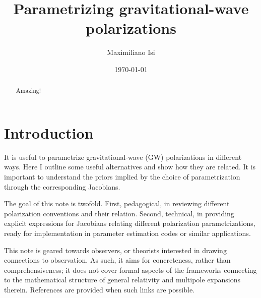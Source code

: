 \documentclass[aps,prd,twocolumn,superscriptaddress,preprintnumbers,floatfix,nofootinbib]{revtex4-2}
\newcommand{\dcc}{LIGO-PXXXXXXX}
\begin{document}

\title{Parametrizing gravitational-wave polarizations}

\author{Maximiliano Isi}


\date{\today}

\begin{abstract}
Amazing!
\end{abstract}

\maketitle


\section{Introduction}
\label{sec:intro}

It is useful to parametrize gravitational-wave (GW) polarizations in different ways.
Here I outline some useful alternatives and show how they are related.
It is important to understand the priors implied by the choice of parametrization through the corresponding Jacobians.

The goal of this note is twofold.
First, pedagogical, in reviewing different polarization conventions and their relation.
Second, technical, in providing explicit expressions for Jacobians relating different polarization parametrizations, ready for implementation in parameter estimation codes or similar applications.

This note is geared towards observers, or theorists interested in drawing connections to observation.
As such, it aims for concreteness, rather than comprehensiveness; it does not cover formal aspects of the frameworks connecting to the mathematical structure of general relativity and multipole expansions therein.
References are provided when such links are possible.
\end{document}
